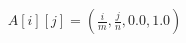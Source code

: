 \documentclass[preview]{standalone}
\begin{document}
\begin{align*}
A[i][j] = \left( \frac{i}{m}, \frac{j}{n}, 0.0, 1.0 \right)
\end{align*}
\end{document}
